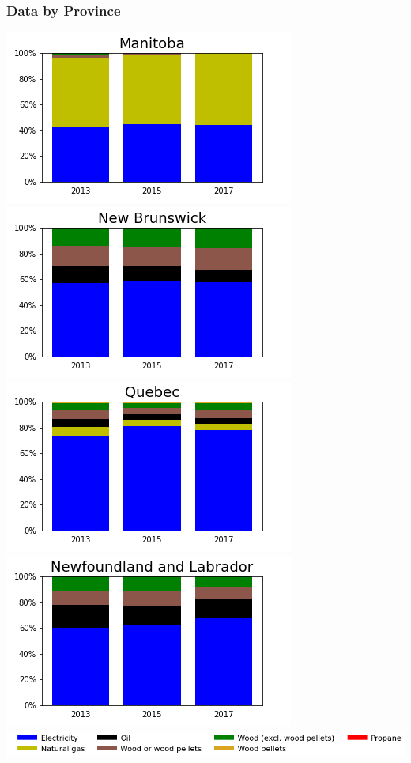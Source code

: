 \documentclass{beamer}
\begin{document}
\begin{frame}
\frametitle{Data by Province}
\vspace{-10pt}
\begin{center}
\includegraphics[width=0.48\linewidth]{mn.png}%
\includegraphics[width=0.48\linewidth]{nb.png}\\
\includegraphics[width=0.48\linewidth]{qc.png}%
\includegraphics[width=0.48\linewidth]{nl.png}\\
\includegraphics[width=0.9\linewidth]{leg_bar.png}
\end{center}
\end{frame}
\end{document}
